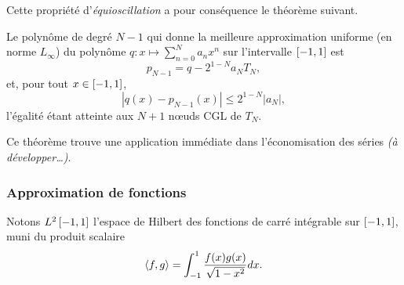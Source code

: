 Cette propriété d'\emph{équioscillation} a pour conséquence le théorème suivant.
\begin{theoreme}
	Le polynôme %
	de degré $N-1$ qui donne la meilleure approximation uniforme (\ie en norme $L_\infty$) %
du polynôme $q : x \mapsto \sum_{n=0}^{N} a_n x^n$ sur l'intervalle $\left[ -1, 1 \right]$ est
	\begin{equation}
		p_{N-1} = q - 2^{1-N} a_N T_N,
	\end{equation}
	et, pour tout $x \in \left[ -1, 1 \right]$,
	\begin{equation}
		\left| q(x)-  p_{N-1}(x)\right| \leq 2^{1-N} \left| a_N \right|,
	\end{equation}
	l'égalité étant atteinte aux $N+1$ n\oe uds CGL de $T_N$.
\end{theoreme}
Ce théorème trouve une application immédiate dans l'économisation des séries \textit{(à développer\ldots)}.

\subsubsection{Approximation de fonctions}
Notons $L^2\left[ -1, 1 \right]$ l'espace de Hilbert des fonctions de carré intégrable sur $\left[ -1, 1 \right]$, muni du produit scalaire
\begin{equation}
	\left \langle {f}, {g} \right \rangle =
	\int_{-1}^{1} \frac{f(x) g(x)}{\sqrt{1 - x^2}} dx.
	\label{eq:chebyshev_scalar_product}
\end{equation}


